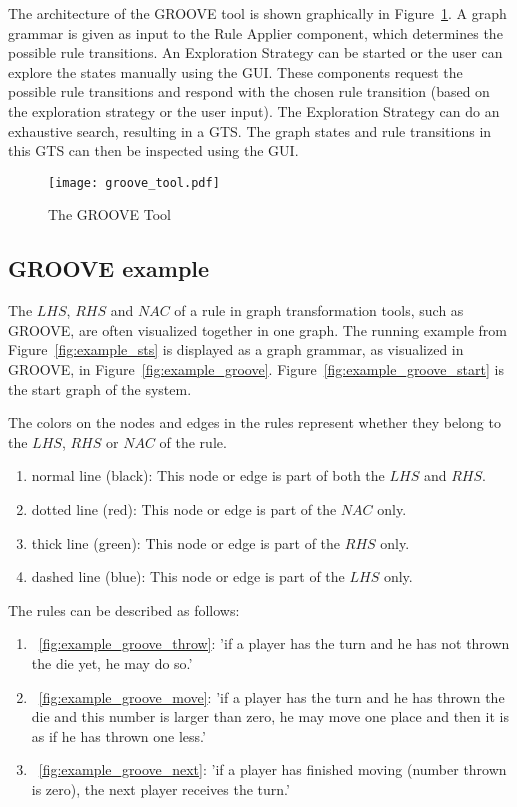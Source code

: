 The architecture of the GROOVE tool is shown graphically in Figure~\ref{fig:groove_tool}. A graph grammar is given as input to the Rule Applier component, which determines the possible rule transitions. An Exploration Strategy can be started or the user can explore the states manually using the GUI. These components request the possible rule transitions and respond with the chosen rule transition (based on the exploration strategy or the user input). The Exploration Strategy can do an exhaustive search, resulting in a GTS. The graph states and rule transitions in this GTS can then be inspected using the GUI.

\begin{figure}[ht]
  \begin{center}
    \texttt{[image: groove\_tool.pdf]}
  \end{center}
  \caption{The GROOVE Tool}
  \label{fig:groove_tool}
\end{figure}

\subsection{GROOVE example}
The $\mathit{LHS}$, $\mathit{RHS}$ and $\mathit{NAC}$ of a rule in graph transformation tools, such as GROOVE, are often visualized together in one graph. The running example from Figure~\ref{fig:example_sts} is displayed as a graph grammar, as visualized in GROOVE, in Figure~\ref{fig:example_groove}. Figure~\ref{fig:example_groove_start} is the start graph of the system.

The colors on the nodes and edges in the rules represent whether they belong to the $\mathit{LHS}$, $\mathit{RHS}$ or $\mathit{NAC}$ of the rule.
\begin{enumerate}
  \item normal line (black): This node or edge is part of both the $\mathit{LHS}$ and $\mathit{RHS}$.
  \item dotted line (red): This node or edge is part of the $\mathit{NAC}$ only.
  \item thick line (green): This node or edge is part of the $\mathit{RHS}$ only.
  \item dashed line (blue): This node or edge is part of the $\mathit{LHS}$ only.
\end{enumerate}

The rules can be described as follows:
\begin{enumerate}
  \item~\ref{fig:example_groove_throw}: 'if a player has the turn and he has not thrown the die yet, he may do so.'
  \item~\ref{fig:example_groove_move}: 'if a player has the turn and he has thrown the die and this number is larger than zero, he may move one place and then it is as if he has thrown one less.'
  \item~\ref{fig:example_groove_next}: 'if a player has finished moving (number thrown is zero), the next player receives the turn.'
\end{enumerate}

